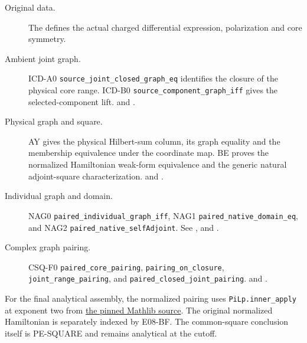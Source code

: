 \begin{description}
\item[Original data.] The  defines the actual charged differential expression, polarization and core symmetry.
\item[Ambient joint graph.] ICD-A0 \nolinkurl{source_joint_closed_graph_eq} identifies the closure of the physical core range. ICD-B0 \nolinkurl{source_component_graph_iff} gives the selected-component lift.  and .
\item[Physical graph and square.] AY gives the physical Hilbert-sum column, its graph equality and the membership equivalence under the coordinate map. BE proves the normalized Hamiltonian weak-form equivalence and the generic natural adjoint-square characterization.  and .
\item[Individual graph and domain.] NAG0 \nolinkurl{paired_individual_graph_iff}, NAG1 \nolinkurl{paired_native_domain_eq}, and NAG2 \nolinkurl{paired_native_selfAdjoint}. See ,  and .
\item[Complex graph pairing.] CSQ-F0 \nolinkurl{paired_core_pairing}, \nolinkurl{pairing_on_closure}, \nolinkurl{joint_range_pairing}, and \nolinkurl{paired_closed_joint_pairing}.  and .
\end{description}

For the final analytical assembly, the normalized pairing uses \texttt{PiLp.inner\_apply} at exponent two from \href{https://github.com/leanprover-community/mathlib4/blob/d13f23b723b8a846827a245b89c10fc7d3f11612/Mathlib/Analysis/InnerProductSpace/PiL2.lean}{the pinned Mathlib source}. The original normalized Hamiltonian is separately indexed by E08-BF. The common-square conclusion itself is PE-SQUARE and remains analytical at the cutoff.

